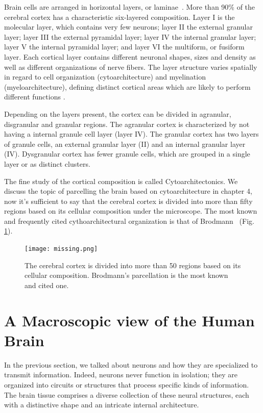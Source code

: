 Brain cells are arranged in horizontal layers, or laminae~\cite{Waehnert2014}.
More than 90\% of the cerebral cortex has a characteristic six-layered composition\cite{RandS.SwensonM.D.2006}.
Layer I is the molecular
layer, which contains very few neurons; layer II the external granular layer;
layer III the external pyramidal layer; layer IV the internal granular layer;
layer V the internal pyramidal layer; and layer VI the multiform, or fusiform
layer. Each cortical layer contains different neuronal shapes, sizes and density
as well as different organizations of nerve fibers\cite{RandS.SwensonM.D.2006}.
The layer structure varies spatially in regard to cell organization (cytoarchitecture) and 
myelination (myeloarchitecture), defining distinct cortical areas which are
likely to perform different functions \cite{Waehnert2014, Bok1929}. 

Depending on the layers present, the cortex can be divided in agranular,
disgranular and granular regions\cite{Mesulam1982}. The agranular cortex is characterized by not
having a internal granule cell layer (layer IV). The granular cortex has two 
layers of granule cells, an external granular layer (II) and an internal granular
layer (IV). Dysgranular cortex has fewer granule cells, which are grouped in a
single layer or as distinct clusters.

The fine study of the cortical composition is called Cytoarchitectonics. We 
discuss the topic of parcelling the brain based on cytoarchitecture in chapter
4, now it's sufficient to say that the cerebral cortex is divided into more than
fifty regions based on its cellular composition under the microscope. The most
known and frequently cited cythoarchitectural organization is that of
Brodmann~\cite{Brodmann1909} (Fig. \ref{fig:brodmann_small}).

\begin{figure}[h]
    \texttt{[image: missing.png]}
    \caption{The cerebral cortex is divided into more than 50 regions based on
             its cellular composition. Brodmann's\cite{Brodmann1909}
             parcellation is the most known and cited one.}
    \label{fig:brodmann_small}
\end{figure}

\section{A Macroscopic view of the Human Brain}
In the previous section, we talked about neurons and how they are specialized
to transmit information. Indeed, neurons never function in isolation; they are
organized into circuits or structures that process specific kinds of information.
The brain tissue comprises a diverse collection of these neural structures,
each with a distinctive shape and an intricate internal architecture.

